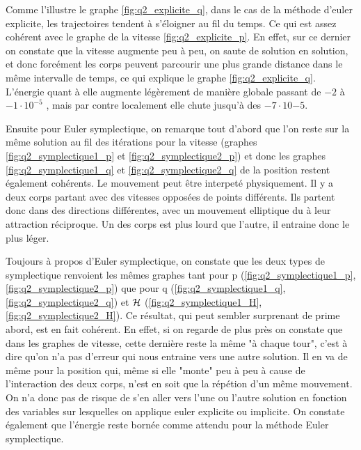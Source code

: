 	Comme l'illustre le graphe \ref{fig:q2_explicite_q}, dans le cas de la méthode d'euler explicite, les trajectoires tendent à s'éloigner au fil du temps. Ce qui est assez cohérent avec le graphe de la vitesse \ref{fig:q2_explicite_p}. En effet, sur ce dernier on constate que la vitesse augmente peu à peu, on saute de solution en solution, et donc forcément les corps peuvent parcourir une plus grande distance dans le même intervalle de temps, ce qui explique le graphe \ref{fig:q2_explicite_q}. L'énergie quant à elle augmente légèrement de manière globale  passant de $-2$ à $-1 \cdot 10^{-5}$ , mais par contre localement elle chute jusqu'à des $-7 \cdot 10{-5}$. 
	
	
	Ensuite pour Euler symplectique, on remarque tout d'abord que l'on reste sur la même solution au fil des itérations pour la vitesse (graphes \ref{fig:q2_symplectique1_p} et \ref{fig:q2_symplectique2_p}) et donc les graphes \ref{fig:q2_symplectique1_q} et \ref{fig:q2_symplectique2_q} de la position restent également cohérents. Le mouvement peut être interpeté physiquement. Il y a deux corps partant avec des vitesses opposées de points différents. Ils partent donc dans des directions différentes, avec un mouvement elliptique du à leur attraction réciproque. Un des corps est plus lourd que l'autre, il entraine donc le plus léger.   
	
	Toujours à propos d'Euler symplectique, on constate que les deux types de symplectique renvoient les mêmes graphes tant pour p (\ref{fig:q2_symplectique1_p}, \ref{fig:q2_symplectique2_p}) que pour q (\ref{fig:q2_symplectique1_q}, \ref{fig:q2_symplectique2_q})  et $\mathcal{H}$ (\ref{fig:q2_symplectique1_H}, \ref{fig:q2_symplectique2_H}). Ce résultat, qui peut sembler surprenant de prime abord, est en fait cohérent. En effet, si on regarde de plus près on constate que dans les graphes de vitesse, cette dernière reste la même "à chaque tour", c'est à dire qu'on n'a pas d'erreur qui nous entraine vers une autre solution. Il en va de même pour la position qui, même si elle "monte" peu à peu à cause de l'interaction des deux corps, n'est en soit que la répétion d'un même mouvement. On n'a donc pas de risque de s'en aller vers l'une ou l'autre solution en fonction des variables sur lesquelles on applique euler explicite ou implicite.  On constate également que l'énergie reste bornée comme attendu pour la méthode Euler symplectique. 

	


